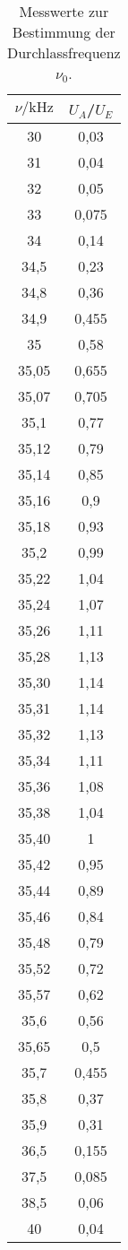 \begin{table}
  \centering
  \caption{Messwerte zur Bestimmung der Durchlassfrequenz $\nu_0$.}
  \label{tab:tab1}
  \begin{tabular}{c c}
    \toprule
    $\nu/\si{\kilo\hertz}$ & $U_A$/$U_E$ \\
    \midrule
    30    & 0,03\\
    31    & 0,04\\
    32    & 0,05\\
    33    & 0,075\\
    34    & 0,14\\
    34,5  & 0,23\\
    34,8  & 0,36\\
    34,9  & 0,455\\
    35    & 0,58\\
    35,05 & 0,655\\
    35,07 & 0,705\\
    35,1  & 0,77\\
    35,12 & 0,79\\
    35,14 & 0,85\\
    35,16 & 0,9\\
    35,18 & 0,93\\
    35,2  & 0,99\\
    35,22 & 1,04\\
    35,24 & 1,07\\
    35,26 & 1,11\\
    35,28 & 1,13\\
    35,30 & 1,14\\
    35,31 & 1,14\\
    35,32 & 1,13\\
    35,34 & 1,11\\
    35,36 & 1,08\\
    35,38 & 1,04\\
    35,40 & 1\\
    35,42 & 0,95\\
    35,44 & 0,89\\
    35,46 & 0,84\\
    35,48 & 0,79\\
    35,52 & 0,72\\
    35,57 & 0,62\\
    35,6  & 0,56\\
    35,65 & 0,5\\
    35,7  & 0,455\\
    35,8  & 0,37\\
    35,9  & 0,31\\
    36,5  & 0,155\\
    37,5  & 0,085\\
    38,5  & 0,06\\
    40    & 0,04\\
  \bottomrule
  \end{tabular}
\end{table}
